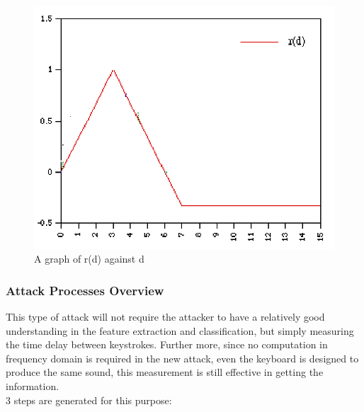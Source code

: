 \documentclass[12pt,a4paper]{article}
\begin{document}
\begin{figure}[h]
\begin{center}
        \includegraphics[scale=0.5]{XcorRdd.png}
        \caption{A graph of r(d) against d}
        \label{fig:11}
\end{center}
\end{figure} \par
\FloatBarrier

\subsubsection{Attack Processes Overview}

This type of attack will not require the attacker to have a relatively good understanding in the feature extraction and classification, but simply measuring the time delay between keystrokes. Further more, since no computation in frequency domain is required in the new attack, even the keyboard is designed to produce the same sound, this measurement is still effective in getting the information.\\ 

3 steps are generated for this purpose: \\
\end{document}
